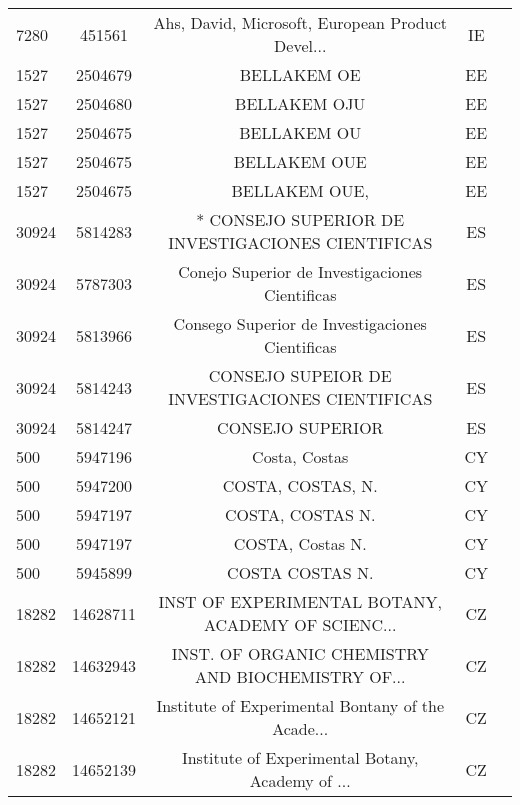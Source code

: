 \begin{longtable}{|l|c|c|c|c|}
      7280 &     451561 &  Ahs, David,  Microsoft, European Product Devel... &      IE \\
      1527 &    2504679 &                                        BELLAKEM OE &      EE \\
      1527 &    2504680 &                                       BELLAKEM OJU &      EE \\
      1527 &    2504675 &                                        BELLAKEM OU &      EE \\
      1527 &    2504675 &                                       BELLAKEM OUE &      EE \\
      1527 &    2504675 &                                      BELLAKEM OUE, &      EE \\
     30924 &    5814283 &  * CONSEJO SUPERIOR DE INVESTIGACIONES CIENTIFICAS &      ES \\
     30924 &    5787303 &     Conejo Superior de Investigaciones Cientificas &      ES \\
     30924 &    5813966 &    Consego Superior de Investigaciones Cientificas &      ES \\
     30924 &    5814243 &     CONSEJO SUPEIOR DE INVESTIGACIONES CIENTIFICAS &      ES \\
     30924 &    5814247 &                                   CONSEJO SUPERIOR &      ES \\
       500 &    5947196 &                                      Costa, Costas &      CY \\
       500 &    5947200 &                                  COSTA, COSTAS, N. &      CY \\
       500 &    5947197 &                                   COSTA, COSTAS N. &      CY \\
       500 &    5947197 &                                   COSTA, Costas N. &      CY \\
       500 &    5945899 &                                    COSTA COSTAS N. &      CY \\
     18282 &   14628711 &  INST OF EXPERIMENTAL BOTANY, ACADEMY OF SCIENC... &      CZ \\
     18282 &   14632943 &  INST. OF ORGANIC CHEMISTRY AND BIOCHEMISTRY OF... &      CZ \\
     18282 &   14652121 &  Institute of Experimental Bontany of the Acade... &      CZ \\
     18282 &   14652139 &  Institute of Experimental Botany, Academy of  ... &      CZ \\

\end{longtable}
